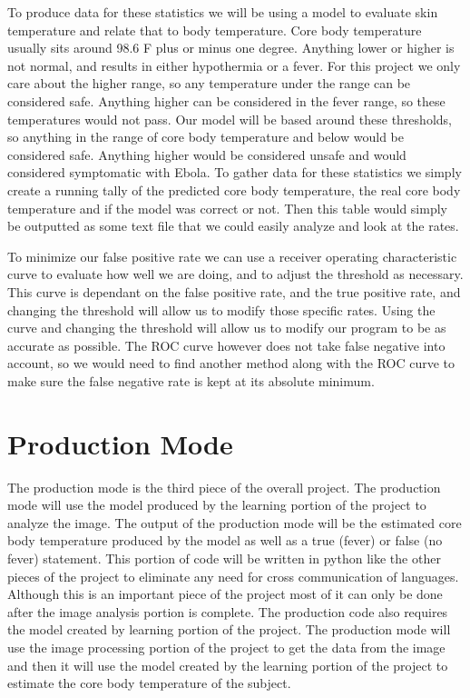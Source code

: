 ﻿\documentclass[onecolumn, draftclsnofoot,10pt, compsoc]{IEEEtran}
\begin{document}
To produce data for these statistics we will be using a model to evaluate skin temperature and relate that to body temperature. Core body temperature usually sits around 98.6 \degree F plus or minus one degree. Anything lower or higher is not normal, and results in either hypothermia or a fever. For this project we only care about the higher range, so any temperature under the range can be considered safe. Anything higher can be considered in the fever range, so these temperatures would not pass. Our model will be based around these thresholds, so anything in the range of core body temperature and below would be considered safe. Anything higher would be considered unsafe and would considered symptomatic with Ebola. To gather data for these statistics we simply create a running tally of the predicted core body temperature, the real core body temperature and if the model was correct or not. Then this table would simply be outputted as some text file that we could easily analyze and look at the rates.

To minimize our false positive rate we can use a receiver operating characteristic curve to evaluate how well we are doing, and to adjust the threshold as necessary. This curve is dependant on the false positive rate, and the true positive rate, and changing the threshold will allow us to modify those specific rates. Using the curve and changing the threshold will allow us to modify our program to be as accurate as possible. The ROC curve however does not take false negative into account, so we would need to find another method along with the ROC curve to make sure the false negative rate is kept at its absolute minimum.



\section{Production Mode}
The production mode is the third piece of the overall project. The production mode will use the model produced by the learning portion of the project to analyze the image. The output of the production mode will be the estimated core body temperature produced by the model as well as a true (fever) or false (no fever) statement. This portion of code will be written in python like the other pieces of the project to eliminate any need for cross communication of languages. Although this is an important piece of the project most of it can only be done after the image analysis portion is complete. The production code also requires the model created by learning portion of the project. The production mode will use the image processing portion of the project to get the data from the image and then it will use the model created by the learning portion of the project to estimate the core body temperature of the subject. 
\end{document}
